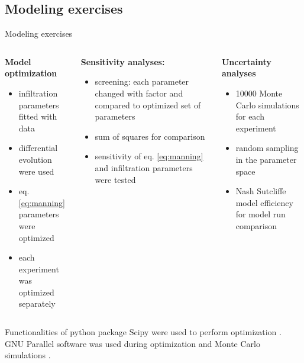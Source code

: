 \subsection{Modeling exercises}
\begin{block}{Modeling exercises}
    \begin{columns}[t]
        \begin{column}{0.3\textwidth}
            {\bf Model optimization}
            \begin{itemize}
                \item infiltration parameters fitted with data
                \item differential evolution were used
                \item eq. \ref{eq:manning} parameters were optimized
                \item each experiment was optimized separately
            \end{itemize}
        \end{column}
        \begin{column}{0.3\textwidth}
            {\bf Sensitivity analyses:}
            \begin{itemize}
                \item screening: each parameter changed with factor and compared to optimized set of parameters 
                \item sum of squares for comparison
                \item sensitivity of eq. \ref{eq:manning} and infiltration parameters were tested
            \end{itemize}
        \end{column}
        \begin{column}{0.3\textwidth}
            {\bf Uncertainty analyses}
            \begin{itemize}
                \item 10000 Monte Carlo simulations for each experiment
                \item random sampling in the parameter space
                \item Nash Sutcliffe model efficiency for model run comparison
            \end{itemize}
        \end{column}
    \end{columns}
    Functionalities of python package Scipy were used to perform optimization \citep{scipy}. GNU Parallel software was used during optimization and Monte Carlo simulations \citep{Tange2011a}. 
\end{block}









        
